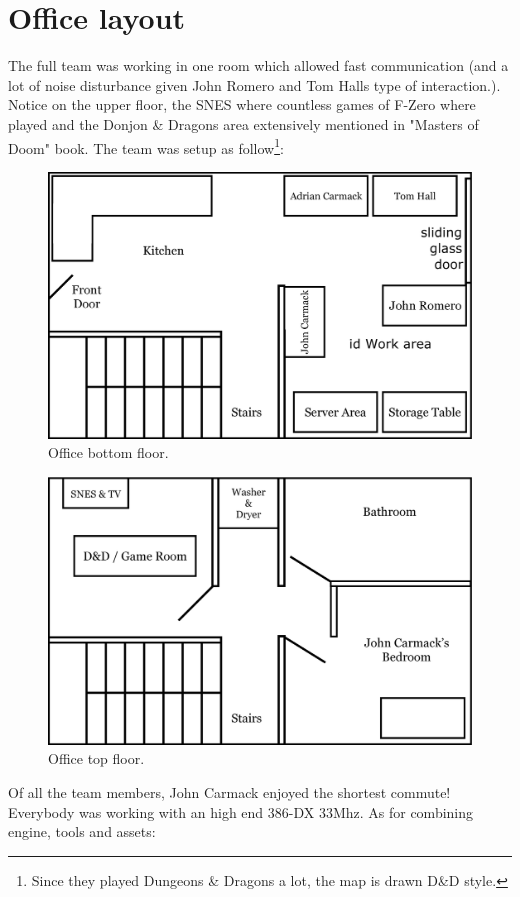\documentclass[book.tex]{subfiles}
\begin{document}
\section{Office layout}
The full team was working in one room which allowed fast communication (and a lot of noise disturbance given John Romero and Tom Halls type of interaction.). Notice on the upper floor, the SNES where countless games of F-Zero where played and the Donjon \& Dragons area extensively mentioned in "Masters of Doom" book.
The team was setup as follow\footnote{Since they played Dungeons \& Dragons a lot, the map is drawn D\&D style.}:
\par
\begin{figure}[H]
  \centering
  \includegraphics[width=\textwidth]{imgs/drawings/map/id-software-office-madison_bottom_floor.eps}
 \caption{Office bottom floor.} 
\end{figure}
\par
\begin{figure}[H]
  \centering
  \includegraphics[width=\textwidth]{imgs/drawings/map/id-software-office-madison_top_floor.eps}
 \caption{Office top floor.} 
\end{figure}
Of all the team members, John Carmack enjoyed the shortest commute! Everybody was working with an high end 386-DX 33Mhz. As for combining engine, tools and assets:\\
\end{document}
